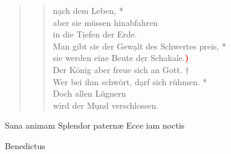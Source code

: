 \begin{quote}
\begin{verse}
\vin n\d ach dem Leben, *\\ 
\vin aber sie müssen hinabfahren\\ 
\vin in die T\d iefen der Erde.\\ 
Man gibt sie der Gew\d alt des Schwertes preis, *\\ 
sie werden eine Beute d\d er Schakale.\textcolor{red}{\bf{)}}\\ \vin 
Der König aber freue sich an Gott. †\\ 
\vin Wer bei ihm schwört, d\d arf sich rühmen. *\\ 
\vin  Doch allen Lügnern\\
\vin wird der M\d und verschlossen.\\  

\end{verse}
\end{quote}

\noindent{} Sana animam  Splendor paternæ  Ecce iam noctis \\


\begin{flushleft}


\medskip

{\rm{
}}
\end{flushleft}

\medskip


\def\greinitialformat#1{{\fontsize{40}{40}\selectfont #1}}
\gresetfirstlineaboveinitial{\footnotesize \textcolor{red}{Benedic}}{}
\setaboveinitialseparation{0.72mm}

\vspace{0.3cm}
 Benedictus 
